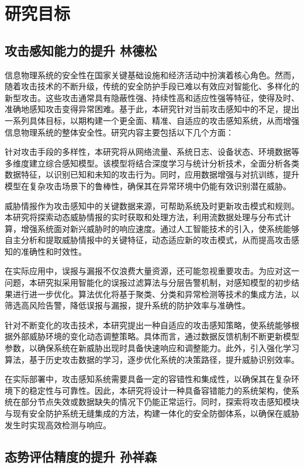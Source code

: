 
\section{研究目标}

\subsection{攻击感知能力的提升 林德松}

信息物理系统的安全性在国家关键基础设施和经济活动中扮演着核心角色。然而，随着攻击技术的不断升级，传统的安全防护手段已难以有效应对智能化、多样化的新型攻击。这些攻击通常具有隐蔽性强、持续性高和适应性强等特征，使得及时、准确地感知攻击变得异常困难。基于此，本研究针对当前攻击感知中的不足，提出一系列具体目标，以期构建一个更全面、精准、自适应的攻击感知系统，从而增强信息物理系统的整体安全性。研究内容主要包括以下几个方面：

针对攻击手段的多样性，本研究将从网络流量、系统日志、设备状态、环境数据等多维度建立综合感知模型。该模型将结合深度学习与统计分析技术，全面分析各类数据特征，以识别已知和未知的攻击行为。同时，应用数据增强与对抗训练，提升模型在复杂攻击场景下的鲁棒性，确保其在异常环境中仍能有效识别潜在威胁。

威胁情报作为攻击感知中的关键数据来源，可帮助系统及时更新攻击模式和规则。本研究将探索动态威胁情报的实时获取和处理方法，利用流数据处理与分布式计算，增强系统面对新兴威胁时的响应速度。通过人工智能技术的引入，使系统能够自主分析和提取威胁情报中的关键特征，动态适应新的攻击模式，从而提高攻击感知的准确性和时效性。

在实际应用中，误报与漏报不仅浪费大量资源，还可能忽视重要攻击。为应对这一问题，本研究拟采用智能化的误报过滤算法与分层告警机制，对感知模型的初步结果进行进一步优化。算法优化将基于聚类、分类和异常检测等技术的集成方法，以筛选高风险告警，降低误报与漏报，提升系统的防护效率与准确性。

针对不断变化的攻击技术，本研究提出一种自适应的攻击感知策略，使系统能够根据外部威胁环境的变化动态调整策略。具体而言，通过数据反馈机制不断更新模型参数，以确保系统在新威胁出现时具备快速响应和调整能力。此外，引入强化学习算法，基于历史攻击数据的学习，逐步优化系统的决策路径，提升威胁识别效率。

在实际部署中，攻击感知系统需要具备一定的容错性和集成性，以确保其在复杂环境下的稳定性与可靠性。因此，本研究将设计一种具备容错能力的系统架构，使系统在部分节点失效或数据缺失的情况下仍能正常运行。同时，探索将攻击感知模块与现有安全防护系统无缝集成的方法，构建一体化的安全防御体系，以确保在威胁发生时实现高效检测与响应。

\subsection{态势评估精度的提升 孙祥森}

